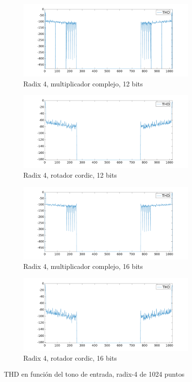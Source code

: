 \begin{figure}[htbp!]
        \advance\leftskip-1.5cm
        \begin{subfigure}{0.6\textwidth}%
        \includegraphics[width=9cm]{./figures/thd_r4_1024_12_mul.png}
        \caption{Radix 4, multiplicador complejo, 12 bits}
        \end{subfigure}%
        \begin{subfigure}{0.6\textwidth}%
        \includegraphics[width=9cm]{./figures/thd_r4_1024_12_cor.png}
        \caption{Radix 4, rotador cordic, 12 bits}
        \end{subfigure} 
        \begin{subfigure}{0.6\textwidth}%
        \includegraphics[width=9cm]{./figures/thd_r4_1024_16_mul.png}
        \caption{Radix 4, multiplicador complejo, 16 bits}
        \end{subfigure}%
        \begin{subfigure}{0.6\textwidth}%
        \includegraphics[width=9cm]{./figures/thd_r4_1024_16_cor.png}
        \caption{Radix 4, rotador cordic, 16 bits}
        \end{subfigure} 
        \caption{THD en función del tono de entrada, radix-4 de 1024 puntos}
        \label{fig:r4_thd_1024}
\end{figure}

